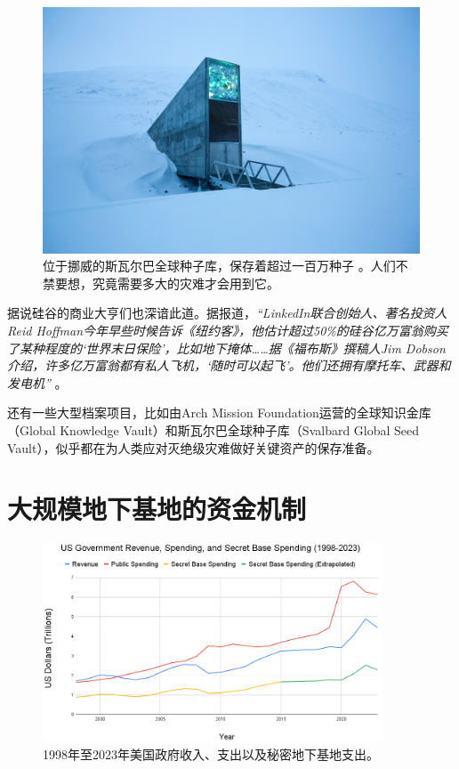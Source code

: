 \documentclass[10pt,twocolumn,letterpaper]{article}
\begin{document}
\begin{figure}[t]
\begin{center}
   \includegraphics[width=1\linewidth]{svalbard.jpg}
\end{center}
   \caption{位于挪威的斯瓦尔巴全球种子库，保存着超过一百万种子 \cite{24}。人们不禁要想，究竟需要多大的灾难才会用到它。}
\label{fig:8}
\label{fig:onecol}
\end{figure}

据说硅谷的商业大亨们也深谙此道。据报道，\textit{“LinkedIn联合创始人、著名投资人Reid Hoffman今年早些时候告诉《纽约客》，他估计超过50\%的硅谷亿万富翁购买了某种程度的‘世界末日保险’，比如地下掩体……据《福布斯》撰稿人Jim Dobson介绍，许多亿万富翁都有私人飞机，‘随时可以起飞’。他们还拥有摩托车、武器和发电机”} \cite{28}。

还有一些大型档案项目，比如由Arch Mission Foundation运营的全球知识金库（Global Knowledge Vault）\cite{29}和斯瓦尔巴全球种子库（Svalbard Global Seed Vault）\cite{30}，似乎都在为人类应对灭绝级灾难做好关键资产的保存准备。

\section{大规模地下基地的资金机制}
\begin{figure}[t]
\begin{center}
\includegraphics[width=0.9\textwidth]{govcrop2.png}
\end{center}
   \caption{1998年至2023年美国政府收入、支出以及秘密地下基地支出\cite{19}。}
   \label{fig:9}
\end{figure}
\end{document}
